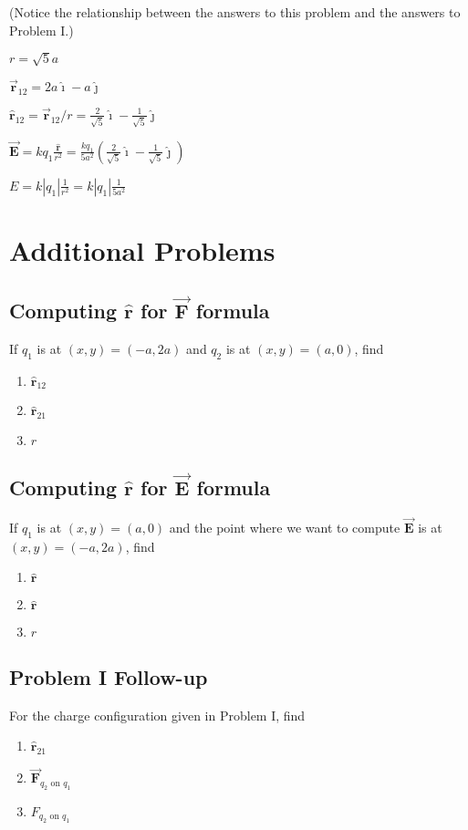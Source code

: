 \documentclass{article}
\newcommand{\ds}[0]{\displaystyle}
\newcommand{\ihat}[0]{\hat{\boldsymbol{\imath}}}
\newcommand{\jhat}[0]{\hat{\boldsymbol{\jmath}}}
\newcommand{\rhat}[0]{\hat{\mathbf{r}}}
\newcommand{\bfvec}[1]{\vec{\mathbf{#1}}}
\begin{document}
(Notice the relationship between the answers to this problem and the answers to Problem I.)

$r = \sqrt{5}a$

$\bfvec{r}_{12}=2a\ihat-a\jhat$

$\rhat_{12}=\bfvec{r}_{12}/r=\frac{2}{\sqrt{5}}\ihat-\frac{1}{\sqrt{5}}\jhat$

$\ds\bfvec{E}=kq_1\frac{\rhat}{r^2}=\frac{kq_1}{5a^2}\left(\frac{2}{\sqrt{5}}\ihat-\frac{1}{\sqrt{5}}\jhat\right)$

$\ds E = k|q_1|\frac{1}{r^2}= k|q_1|\frac{1}{5a^2}$
\else


\fi

\newpage

\section{Additional Problems}

\subsection{Computing $\rhat$ for $\bfvec{F}$ formula}

If $q_1$ is at $(x,y)=(-a,2a)$ and $q_2$ is at $(x,y)=(a,0)$, find

\begin{enumerate}

  \item $\rhat_{12}$

  \item $\rhat_{21}$

  \item $r$

\end{enumerate}

\subsection{Computing $\rhat$ for $\bfvec{E}$ formula}

If $q_1$ is at $(x,y)=(a,0)$ and the point where we want to compute $\bfvec{E}$ is at $(x,y)=(-a,2a)$, find

\begin{enumerate}

  \item $\rhat$

  \item $\rhat$

  \item $r$

\end{enumerate}

\subsection{Problem I Follow-up}

For the charge configuration given in Problem I, find

\begin{enumerate}

  \item $\rhat_{21}$

  \item $\bfvec{F}_{q_2\text{ on }q_1}$

  \item $F_{q_2\text{ on }q_1}$

\end{enumerate}
\end{document}
